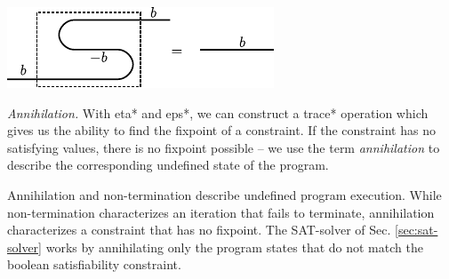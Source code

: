\documentclass[preprint]{sigplanconf}
\begin{document}
\begin{center}
  \includegraphics{diagrams/coherence.pdf}
\end{center}

\emph{Annihilation.}  
With {{eta*}} and {{eps*}}, we can construct a {{trace*}} operation
which gives us the ability to find the fixpoint of a constraint.  If
the constraint has no satisfying values, there is no fixpoint possible
-- we use the term \emph{annihilation} to describe the corresponding
undefined state of the program.

Annihilation and non-termination describe undefined program
execution. While non-termination characterizes an iteration that fails
to terminate, annihilation characterizes a constraint that has no
fixpoint. The SAT-solver of Sec. \ref{sec:sat-solver} works by
annihilating only the program states that do not match the boolean
satisfiability constraint.

\end{document}
